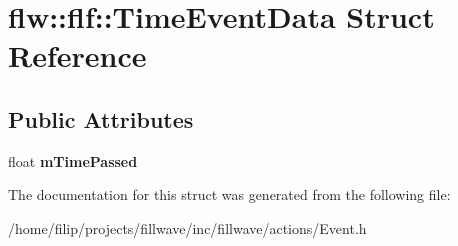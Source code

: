 \hypertarget{structflw_1_1flf_1_1TimeEventData}{}\section{flw\+:\+:flf\+:\+:Time\+Event\+Data Struct Reference}
\label{structflw_1_1flf_1_1TimeEventData}
\subsection*{Public Attributes}
\begin{DoxyCompactItemize}
\item 
\mbox{\label{structflw_1_1flf_1_1TimeEventData_abe2b686be320d6b7a9fd424fe37b7f62}} 
float {\bfseries m\+Time\+Passed}
\end{DoxyCompactItemize}


The documentation for this struct was generated from the following file\+:\begin{DoxyCompactItemize}
\item 
/home/filip/projects/fillwave/inc/fillwave/actions/Event.\+h\end{DoxyCompactItemize}
